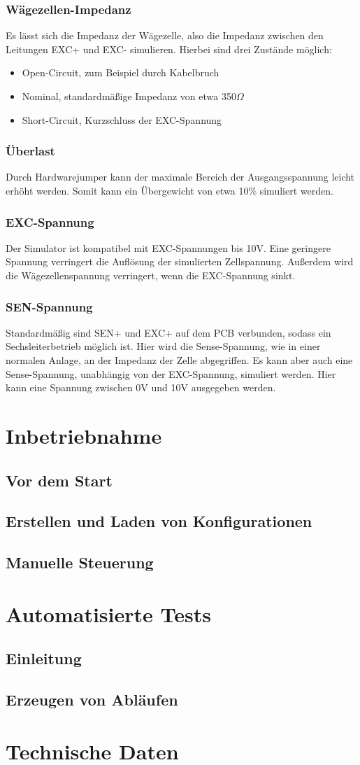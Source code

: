 \documentclass[12pt, a4paper]{report}
\begin{document}
\subsection{Wägezellen-Impedanz}
Es lässt sich die Impedanz der Wägezelle, also die Impedanz zwischen den Leitungen EXC+ und EXC- simulieren. Hierbei sind drei Zustände möglich:
\begin{itemize}
\item Open-Circuit, zum Beispiel durch Kabelbruch
\item Nominal, standardmäßige Impedanz von etwa 350$\Omega$
\item Short-Circuit, Kurzschluss der EXC-Spannung
\end{itemize}
\subsection{Überlast}
Durch Hardwarejumper kann der maximale Bereich der Ausgangsspannung leicht erhöht werden. Somit kann ein Übergewicht von etwa 10\% simuliert werden.
\subsection{EXC-Spannung}
Der Simulator ist kompatibel mit EXC-Spannungen bis 10V. Eine geringere Spannung verringert die Auflösung der simulierten Zellspannung. Außerdem wird die Wägezellenspannung verringert, wenn die EXC-Spannung sinkt. 
\subsection{SEN-Spannung}
Standardmäßig sind SEN+ und EXC+ auf dem PCB verbunden, sodass ein Sechsleiterbetrieb möglich ist. Hier wird die Sense-Spannung, wie in einer normalen Anlage, an der Impedanz der Zelle abgegriffen. Es kann aber auch eine Sense-Spannung, unabhängig von der EXC-Spannung, simuliert werden. Hier kann eine Spannung zwischen 0V und 10V ausgegeben werden.
\chapter{Inbetriebnahme}
\section{Vor dem Start}
\section{Erstellen und Laden von Konfigurationen}
\section{Manuelle Steuerung}
\chapter{Automatisierte Tests}
\section{Einleitung}
\section{Erzeugen von Abläufen}
\chapter{Technische Daten}
\end{document}
